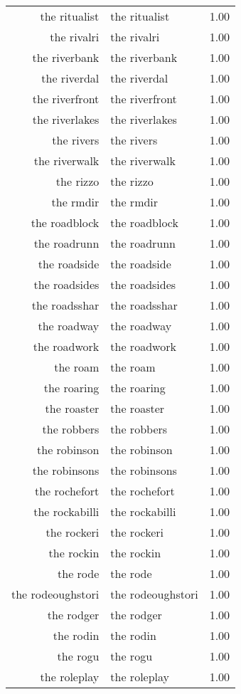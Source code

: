 \begin{table}[ht]
\begin{tabular}{rlr}
  the ritualist & the ritualist & 1.00 \\ 
  the rivalri & the rivalri & 1.00 \\ 
  the riverbank & the riverbank & 1.00 \\ 
  the riverdal & the riverdal & 1.00 \\ 
  the riverfront & the riverfront & 1.00 \\ 
  the riverlakes & the riverlakes & 1.00 \\ 
  the rivers & the rivers & 1.00 \\ 
  the riverwalk & the riverwalk & 1.00 \\ 
  the rizzo & the rizzo & 1.00 \\ 
  the rmdir & the rmdir & 1.00 \\ 
  the roadblock & the roadblock & 1.00 \\ 
  the roadrunn & the roadrunn & 1.00 \\ 
  the roadside & the roadside & 1.00 \\ 
  the roadsides & the roadsides & 1.00 \\ 
  the roadsshar & the roadsshar & 1.00 \\ 
  the roadway & the roadway & 1.00 \\ 
  the roadwork & the roadwork & 1.00 \\ 
  the roam & the roam & 1.00 \\ 
  the roaring & the roaring & 1.00 \\ 
  the roaster & the roaster & 1.00 \\ 
  the robbers & the robbers & 1.00 \\ 
  the robinson & the robinson & 1.00 \\ 
  the robinsons & the robinsons & 1.00 \\ 
  the rochefort & the rochefort & 1.00 \\ 
  the rockabilli & the rockabilli & 1.00 \\ 
  the rockeri & the rockeri & 1.00 \\ 
  the rockin & the rockin & 1.00 \\ 
  the rode & the rode & 1.00 \\ 
  the rodeoughstori & the rodeoughstori & 1.00 \\ 
  the rodger & the rodger & 1.00 \\ 
  the rodin & the rodin & 1.00 \\ 
  the rogu & the rogu & 1.00 \\ 
  the roleplay & the roleplay & 1.00 \\ 

\end{tabular}
\end{table}

